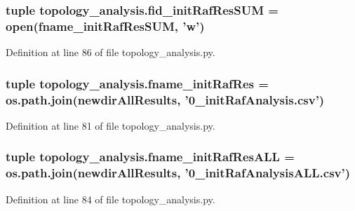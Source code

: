 \hypertarget{a00128_a89401fb2ff1eb8e1567b1625ad0bb84f}{
\subsubsection[{fid\-\_\-init\-Raf\-Res\-S\-U\-M}]{\setlength{\rightskip}{0pt plus 5cm}tuple topology\-\_\-analysis.\-fid\-\_\-init\-Raf\-Res\-S\-U\-M = open({\bf fname\-\_\-init\-Raf\-Res\-S\-U\-M}, 'w')}}\label{a00128_a89401fb2ff1eb8e1567b1625ad0bb84f}


Definition at line 86 of file topology\-\_\-analysis.\-py.

\hypertarget{a00128_a80488e9379ed7dc114c3ea6739d4fda9}{
\subsubsection[{fname\-\_\-init\-Raf\-Res}]{\setlength{\rightskip}{0pt plus 5cm}tuple topology\-\_\-analysis.\-fname\-\_\-init\-Raf\-Res = os.\-path.\-join({\bf newdir\-All\-Results}, '0\-\_\-init\-Raf\-Analysis.\-csv')}}\label{a00128_a80488e9379ed7dc114c3ea6739d4fda9}


Definition at line 81 of file topology\-\_\-analysis.\-py.

\hypertarget{a00128_a2ef3a802ca870bda339c2b50c046bc71}{
\subsubsection[{fname\-\_\-init\-Raf\-Res\-A\-L\-L}]{\setlength{\rightskip}{0pt plus 5cm}tuple topology\-\_\-analysis.\-fname\-\_\-init\-Raf\-Res\-A\-L\-L = os.\-path.\-join({\bf newdir\-All\-Results}, '0\-\_\-init\-Raf\-Analysis\-A\-L\-L.\-csv')}}\label{a00128_a2ef3a802ca870bda339c2b50c046bc71}


Definition at line 84 of file topology\-\_\-analysis.\-py.

